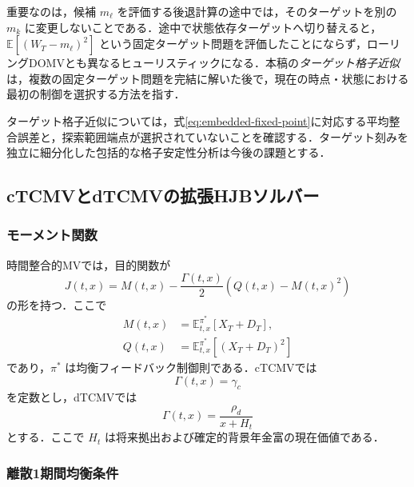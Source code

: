 \documentclass[10pt,a4paper]{article}
\theoremstyle{plain}
\theoremstyle{definition}
\newcommand{\E}{\mathbb{E}}
\begin{document}
重要なのは，候補 $m_\ell$ を評価する後退計算の途中では，そのターゲットを別の $m_k$ に変更しないことである．途中で状態依存ターゲットへ切り替えると，$\E[(W_T-m_\ell)^2]$ という固定ターゲット問題を評価したことにならず，ローリングDOMVとも異なるヒューリスティックになる．本稿の\emph{ターゲット格子近似}は，複数の固定ターゲット問題を完結に解いた後で，現在の時点・状態における最初の制御を選択する方法を指す．

ターゲット格子近似については，式\eqref{eq:embedded-fixed-point}に対応する平均整合誤差と，探索範囲端点が選択されていないことを確認する．ターゲット刻みを独立に細分化した包括的な格子安定性分析は今後の課題とする．

\subsection{cTCMVとdTCMVの拡張HJBソルバー}
\label{sec:extended}

\subsubsection{モーメント関数}

時間整合的MVでは，目的関数が
\begin{equation}
  J(t,x)=M(t,x)-\frac{\Gamma(t,x)}{2}
  \left(Q(t,x)-M(t,x)^2\right)
  \label{eq:tc-objective}
\end{equation}
の形を持つ．ここで
\begin{align}
  M(t,x)&=\E_{t,x}^{\pi^*}[X_T+D_T],\label{eq:M-def}\\
  Q(t,x)&=\E_{t,x}^{\pi^*}[(X_T+D_T)^2]\label{eq:Q-def}
\end{align}
であり，$\pi^*$ は均衡フィードバック制御則である．cTCMVでは
\begin{equation}
  \Gamma(t,x)=\gamma_c
  \label{eq:gamma-c}
\end{equation}
を定数とし，dTCMVでは
\begin{equation}
  \Gamma(t,x)=\frac{\rho_d}{x+H_t}
  \label{eq:gamma-d}
\end{equation}
とする．ここで $H_t$ は将来拠出および確定的背景年金富の現在価値である．

\subsubsection{離散1期間均衡条件}
\end{document}
